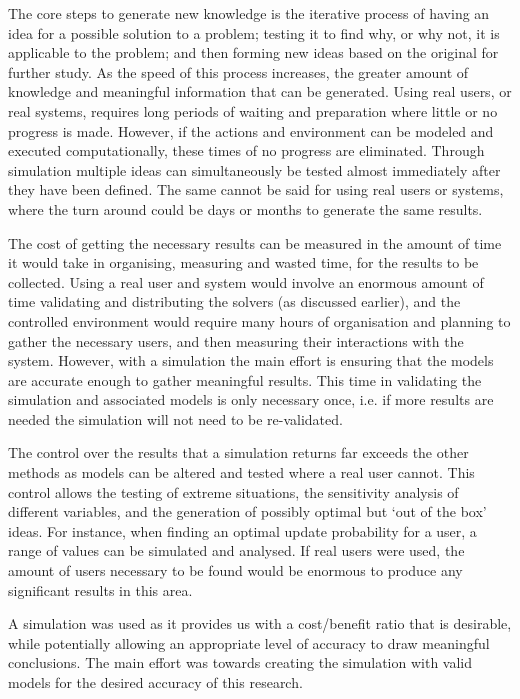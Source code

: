 The core steps to generate new knowledge is the iterative process of having an idea for a possible solution to a problem; 
testing it to find why, or why not, it is applicable to the problem;
and then forming new ideas based on the original for further study.
As the speed of this process increases, the greater amount of knowledge and meaningful information that can be generated. 
Using real users, or real systems, requires long periods of waiting and preparation where little or no progress is made.
However, if the actions and environment can be modeled and executed computationally, these times of no progress are eliminated.
Through simulation multiple ideas can simultaneously be tested almost immediately after they have been defined.
The same cannot be said for using real users or systems, where the turn around could be days or months to generate the same results.  

The cost of getting the necessary results can be measured in the amount of time it would take in organising, measuring and wasted time, for the results to be collected.
Using a real user and system would involve an enormous amount of time validating and distributing the solvers (as discussed earlier), 
and the controlled environment would require many hours of organisation and planning to gather the necessary users, and then measuring their interactions with the system.
However, with a simulation the main effort is ensuring that the models are accurate enough to gather meaningful results.
This time in validating the simulation and associated models is only necessary once, 
i.e. if more results are needed the simulation will not need to be re-validated.

The control over the results that a simulation returns far exceeds the other methods as models can be altered and tested where a real user cannot. 
This control allows the testing of extreme situations, the sensitivity analysis of different variables,
and the generation of possibly optimal but `out of the box' ideas. 
For instance, when finding an optimal update probability for a user, a range of values can be simulated and analysed.
If real users were used, the amount of users necessary to be found would be enormous to produce any significant results in this area.

A simulation was used as it provides us with a cost/benefit ratio that is desirable, while potentially allowing an appropriate level of accuracy to draw meaningful conclusions.
The main effort was towards creating the simulation with valid models for the desired accuracy of this research.

